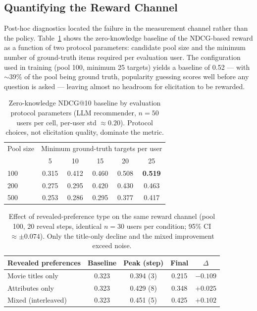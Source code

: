 \documentclass[11pt]{article}
\begin{document}
\subsection{Quantifying the Reward Channel}

Post-hoc diagnostics located the failure in the measurement channel rather
than the policy. Table~\ref{tab:pool_baseline} shows the zero-knowledge
baseline of the NDCG-based reward as a function of two protocol parameters:
candidate pool size and the minimum number of ground-truth items required
per evaluation user. The configuration used in training (pool 100, minimum
25 targets) yields a baseline of 0.52 --- with $\sim$39\% of the pool being
ground truth, popularity guessing scores well before any question is asked
--- leaving almost no headroom for elicitation to be rewarded.

\begin{table}[t]
\centering
\caption{Zero-knowledge NDCG@10 baseline by evaluation protocol parameters
(LLM recommender, $n = 50$ users per cell, per-user std $\approx 0.20$).
Protocol choices, not elicitation quality, dominate the metric.}
\label{tab:pool_baseline}
\small
\begin{tabular}{lccccc}
\toprule
Pool size & \multicolumn{5}{c}{Minimum ground-truth targets per user} \\
 & 5 & 10 & 15 & 20 & 25 \\
\midrule
100 & 0.315 & 0.412 & 0.460 & 0.508 & \textbf{0.519} \\
200 & 0.275 & 0.295 & 0.420 & 0.430 & 0.463 \\
500 & 0.253 & 0.286 & 0.295 & 0.377 & 0.417 \\
\bottomrule
\end{tabular}
\end{table}

\begin{table}[t]
\centering
\caption{Effect of revealed-preference type on the same reward channel
(pool 100, 20 reveal steps, identical $n = 30$ users per condition;
95\% CI $\approx \pm 0.074$). Only the title-only decline and the mixed
improvement exceed noise.}
\label{tab:pref_type}
\small
\begin{tabular}{lcccc}
\toprule
Revealed preferences & Baseline & Peak (step) & Final & $\Delta$ \\
\midrule
Movie titles only & 0.323 & 0.394 (3) & 0.215 & $-0.109$ \\
Attributes only & 0.323 & 0.429 (8) & 0.348 & $+0.025$ \\
Mixed (interleaved) & 0.323 & 0.451 (5) & 0.425 & $+0.102$ \\
\bottomrule
\end{tabular}
\end{table}
\end{document}
